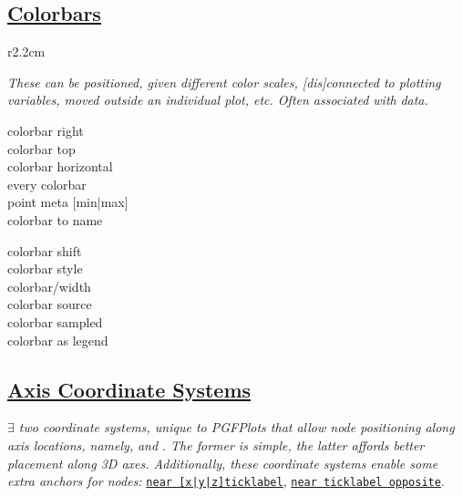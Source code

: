 \subsection*{\href{\docurl\#pgfp./pgfplots/colorbar}{Colorbars}}

\begin{wrapfigure}[5]{r}{2.2cm}
\vspace{-8mm}
\resizebox{2cm}{!}{}
\end{wrapfigure}

\textit{These can be positioned, given different color scales, [dis]connected to plotting variables, moved outside an individual plot, etc. Often associated with }\href{\docurl\#pgfp./pgfplots/point:meta}{}\textit{ data.}

{\color{blue}
\begin{minipage}[t]{3.0cm}
colorbar right\\
colorbar top\\
colorbar horizontal\\
every colorbar\\ 
point meta [min|max]\\
colorbar to name
\end{minipage}
\begin{minipage}[t]{3.0cm}
colorbar shift\\
colorbar style\\
colorbar/width\\
colorbar source\\
colorbar sampled\\
colorbar as legend
\end{minipage}}



\subsection*{\href{\docurl\#pgfp.axis:description:cs}{Axis Coordinate Systems}}

\textit{$\exists$ two coordinate systems, unique to PGFPlots that allow node positioning along axis locations, namely, }\href{\docurl\#pgfp./pgfplots/axis:description:cs}{}\textit{ and }\href{\docurl\#pgfp./xticklabel:cs}{}\textit{. The former is simple, the latter affords better placement along 3D axes. Additionally, these coordinate systems enable some extra anchors for nodes: }\texttt{\href{\docurl\#pgfp.near:xticklabel}{near [x|y|z]ticklabel}}, \texttt{\href{\docurl\#pgfp.near:xticklabel:opposite}{near ticklabel opposite}}.

